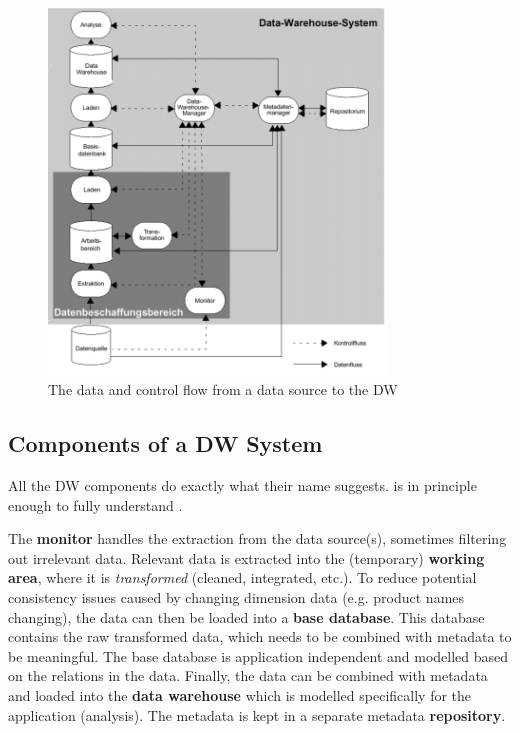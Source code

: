 \documentclass{article}
\begin{document}
\begin{figure}
    \center
    \includegraphics[width=0.8\textwidth]{control_flow.png}
    \caption{The data and control flow from a data source to the DW}
    \label{fig:flow}
\end{figure}

\subsection{Components of a DW System}
\begin{keypointbox}
    All the DW components do exactly what their name suggests.
     is in principle enough to fully understand .
\end{keypointbox}

The \textbf{monitor} handles the extraction from the data source(s), sometimes filtering out irrelevant data.
Relevant data is extracted into the (temporary) \textbf{working area}, where it is \textit{transformed} (cleaned, integrated, etc.).
To reduce potential consistency issues caused by changing dimension data (e.g. product names changing), the data can then be loaded into a \textbf{base database}.
This database contains the raw transformed data, which needs to be combined with metadata to be meaningful.
The base database is application independent and modelled based on the relations in the data.
Finally, the data can be combined with metadata and loaded into the \textbf{data warehouse} which is modelled specifically for the application (analysis).
The metadata is kept in a separate metadata \textbf{repository}.
\end{document}
